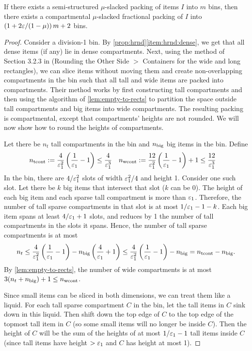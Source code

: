 \begin{lemma}
\label{lem:ss-to-round-cont}
If there exists a semi-structured $\mu$-slacked packing of items $I$ into $m$ bins,
then there exists a compartmental $\mu$-slacked fractional packing of $I$ into
$\left( 1 + 2\varepsilon/(1-\mu) \right) m + 2$ bins.
\end{lemma}
\begin{proof}
Consider a division-1 bin. By \cref{prop:hrnd}\ref{item:hrnd:dense},
we get that all dense items (if any) lie in dense compartments.
Next, using the method of Section 3.2.3 in \cite{pradel-thesis}
(Rounding the Other Side $>$ Containers for the wide and long rectangles),
we can slice items without moving them and create non-overlapping compartments in the bin
such that all tall and wide items are packed into compartments.
Their method works by first constructing tall compartments
and then using the algorithm of \cref{lem:empty-to-rects} to partition
the space outside tall compartments and big items into wide compartments.
The resulting packing is compartmental, except that compartments' heights are not rounded.
We will now show how to round the heights of compartments.

Let there be $n_t$ tall compartments in the bin and $n_{\mathrm{big}}$ big items in the bin. Define
\begin{align*}
n_{\mathrm{tcont}} &:= \frac{4}{\varepsilon_1^2}\left(\frac{1}{\varepsilon_1}-1\right)
    \le \frac{4}{\varepsilon_1^3}
&n_{\mathrm{wcont}} &:= \frac{12}{\varepsilon_1^2}\left(\frac{1}{\varepsilon_1} - 1\right) + 1
    \le \frac{12}{\varepsilon_1^3}
\end{align*}
In the bin, there are $4/\varepsilon_1^2$ slots of width $\varepsilon_1^2/4$ and height 1.
Consider one such slot. Let there be $k$ big items that intersect that slot ($k$ can be 0).
The height of each big item and each sparse tall compartment is more than $\varepsilon_1$.
Therefore, the number of tall sparse compartments in that slot is at most $1/\varepsilon_1 - 1 - k$.
Each big item spans at least $4/\varepsilon_1+1$ slots,
and reduces by 1 the number of tall compartments in the slots it spans.
Hence, the number of tall sparse compartments is at most
\[ n_t \le \frac{4}{\varepsilon_1^2}\left(\frac{1}{\varepsilon_1}-1\right)
    - n_{\mathrm{big}}\left(\frac{4}{\varepsilon_1} + 1\right)
\le \frac{4}{\varepsilon_1^2}\left(\frac{1}{\varepsilon_1}-1\right) - n_{\mathrm{big}}
= n_{\mathrm{tcont}} - n_{\mathrm{big}}. \]
By \cref{lem:empty-to-rects}, the number of wide compartments is at most
$3(n_t + n_{\mathrm{big}}) + 1 \le n_{\mathrm{wcont}}$.

Since small items can be sliced in both dimensions, we can treat them like a liquid.
For each tall sparse compartment $C$ in the bin,
let the tall items in $C$ sink down in this liquid.
Then shift down the top edge of $C$ to the top edge of the
topmost tall item in $C$ (so some small items will no longer be inside $C$).
Then the height of $C$ will be the sum of the heights of at most $1/\varepsilon_1-1$
tall items inside $C$ (since tall items have height $> \varepsilon_1$ and $C$ has height at most 1).


\end{proof}
